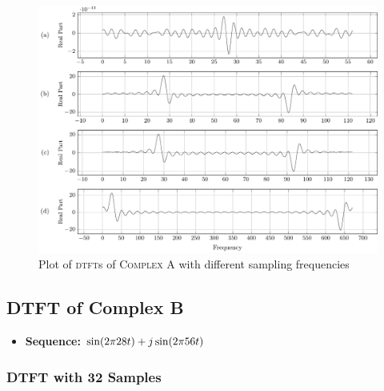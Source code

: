 \documentclass[../../course]{subfiles}
\begin{document}
\vfill

\begin{figure} [H]
    \centering
     {
        \includegraphics[height = 0.8\textheight] {tikzpics/plotDtftComplexA64.pdf}
    }
     {Plot of \textsc{dtft}s of \textsc{Complex A} with different sampling frequencies}
    \label{plt:dtftCplxA64}
\end{figure}

\pagebreak

\subsection{DTFT of Complex B} \label{ssec:dtftCplxB}

\begin{itemize} [label=]

    \item \textbf{Sequence:} $\sin(2 \pi 28 t) + j \sin(2 \pi 56 t)$

\end{itemize}

\subsubsection{DTFT with 32 Samples}
\end{document}
